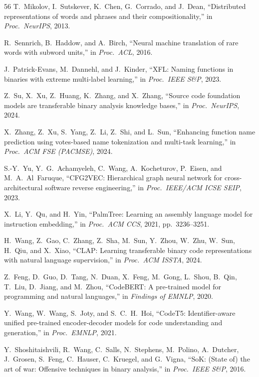 \documentclass[sigconf,nonacm]{acmart}
\begin{document}
{\begin{thebibliography}{56}
T.~Mikolov, I.~Sutskever, K.~Chen, G.~Corrado, and J.~Dean, ``Distributed representations of words and phrases and their compositionality,'' in \emph{Proc.\ NeurIPS}, 2013.

R.~Sennrich, B.~Haddow, and A.~Birch, ``Neural machine translation of rare words with subword units,'' in \emph{Proc.\ ACL}, 2016.

J.~Patrick-Evans, M.~Dannehl, and J.~Kinder, ``XFL: Naming functions in binaries with extreme multi-label learning,'' in \emph{Proc.\ IEEE S\&P}, 2023.

Z.~Su, X.~Xu, Z.~Huang, K.~Zhang, and X.~Zhang, ``Source code foundation models are transferable binary analysis knowledge bases,'' in \emph{Proc.\ NeurIPS}, 2024.

X.~Zhang, Z.~Xu, S.~Yang, Z.~Li, Z.~Shi, and L.~Sun, ``Enhancing function name prediction using votes-based name tokenization and multi-task learning,'' in \emph{Proc.\ ACM FSE (PACMSE)}, 2024.

S.-Y.~Yu, Y.~G.~Achamyeleh, C.~Wang, A.~Kocheturov, P.~Eisen, and M.~A.~Al~Faruque, ``CFG2VEC: Hierarchical graph neural network for cross-architectural software reverse engineering,'' in \emph{Proc.\ IEEE/ACM ICSE SEIP}, 2023.

X.~Li, Y.~Qu, and H.~Yin, ``PalmTree: Learning an assembly language model for instruction embedding,'' in \emph{Proc.\ ACM CCS}, 2021, pp.~3236--3251.

H.~Wang, Z.~Gao, C.~Zhang, Z.~Sha, M.~Sun, Y.~Zhou, W.~Zhu, W.~Sun, H.~Qiu, and X.~Xiao, ``CLAP: Learning transferable binary code representations with natural language supervision,'' in \emph{Proc.\ ACM ISSTA}, 2024.

Z.~Feng, D.~Guo, D.~Tang, N.~Duan, X.~Feng, M.~Gong, L.~Shou, B.~Qin, T.~Liu, D.~Jiang, and M.~Zhou, ``CodeBERT: A pre-trained model for programming and natural languages,'' in \emph{Findings of EMNLP}, 2020.

Y.~Wang, W.~Wang, S.~Joty, and S.~C.~H.~Hoi, ``CodeT5: Identifier-aware unified pre-trained encoder-decoder models for code understanding and generation,'' in \emph{Proc.\ EMNLP}, 2021.

Y.~Shoshitaishvili, R.~Wang, C.~Salls, N.~Stephens, M.~Polino, A.~Dutcher, J.~Grosen, S.~Feng, C.~Hauser, C.~Kruegel, and G.~Vigna, ``SoK: (State of) the art of war: Offensive techniques in binary analysis,'' in \emph{Proc.\ IEEE S\&P}, 2016.


\end{thebibliography}}
\end{document}
